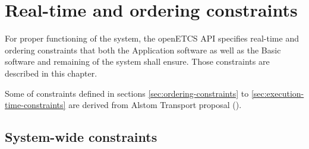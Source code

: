 \chapter{Real-time and ordering constraints}

For proper functioning of the system, the openETCS API specifies
real-time and ordering constraints that both the Application software
as well as the Basic software and remaining of the system shall
ensure. Those constraints are described in this chapter.

Some of constraints defined in sections \ref{sec:ordering-constraints}
to \ref{sec:execution-time-constraints} are derived from Alstom
Transport proposal (\cite{alstom-api}).

\section{System-wide constraints}

